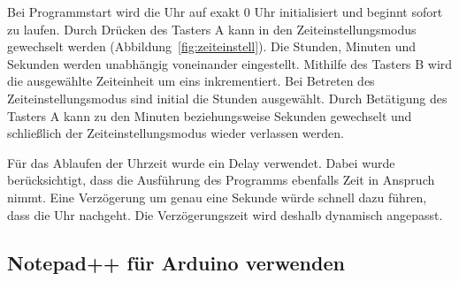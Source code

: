 Bei Programmstart wird die Uhr auf exakt 0 Uhr initialisiert und beginnt sofort zu laufen. Durch Drücken des Tasters A kann in den Zeiteinstellungsmodus gewechselt werden  (Abbildung~\ref{fig:zeiteinstell}). Die Stunden, Minuten und Sekunden werden unabhängig voneinander eingestellt. Mithilfe des Tasters B wird die ausgewählte Zeiteinheit um eins inkrementiert. Bei Betreten des Zeiteinstellungsmodus sind initial die Stunden ausgewählt. Durch Betätigung des Tasters A kann zu den Minuten beziehungsweise Sekunden gewechselt und schließlich der Zeiteinstellungsmodus wieder verlassen werden.

Für das Ablaufen der Uhrzeit wurde ein Delay verwendet. Dabei wurde berücksichtigt, dass die Ausführung des Programms ebenfalls Zeit in Anspruch nimmt. Eine Verzögerung um genau eine Sekunde würde schnell dazu führen, dass die Uhr nachgeht. Die Verzögerungszeit wird deshalb dynamisch angepasst.

\subsection{Notepad++ für Arduino verwenden}

